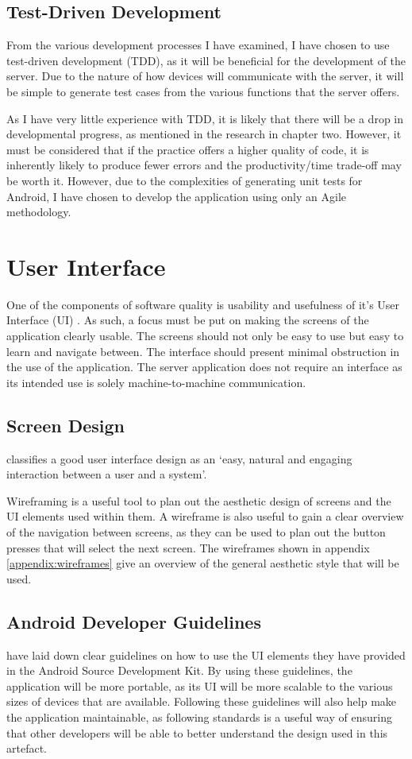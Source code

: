 \subsection{Test-Driven Development}
From the various development processes I have examined, I have chosen to use test-driven development (TDD), as it will be beneficial for the development of the server.
Due to the nature of how devices will communicate with the server, it will be simple to generate test cases from the various functions that the server offers.

As I have very little experience with TDD, it is likely that there will be a drop in developmental progress, as mentioned in the research in chapter two.
However, it must be considered that if the practice offers a higher quality of code, it is inherently likely to produce fewer errors and the productivity/time trade-off may be worth it.
However, due to the complexities of generating unit tests for Android, I have chosen to develop the application using only an Agile methodology.

\section{User Interface}
One of the components of software quality is usability and usefulness of it's User Interface (UI) \citep{isosoftwarequality}. 
As such, a focus must be put on making the screens of the application clearly usable.
The screens should not only be easy to use but easy to learn and navigate between. The interface should present minimal obstruction in the use of the application. 
The server application does not require an interface as its intended use is solely machine-to-machine communication.

\subsection{Screen Design}
\cite{stone2005user} classifies a good user interface design as an `easy, natural and engaging interaction between a user and a system'.

Wireframing is a useful tool to plan out the aesthetic design of screens and the UI elements used within them.
A wireframe is also useful to gain a clear overview of the navigation between screens, as they can be used to plan out the button presses that will select the next screen.
The wireframes shown in appendix \ref{appendix:wireframes} give an overview of the general aesthetic style that will be used.

\subsection{Android Developer Guidelines}
\label{devguidelines}
\cite{materialdesignguidelines} have laid down clear guidelines on how to use the UI elements they have provided in the Android Source Development Kit.
By using these guidelines, the application will be more portable, as its UI will be more scalable to the various sizes of devices that are available.%
Following these guidelines will also help make the application maintainable, as following standards is a useful way of ensuring that other developers will be able to better understand the design used in this artefact.